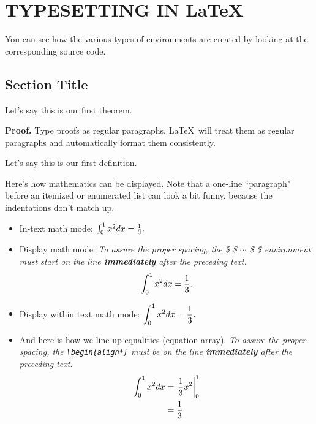 \chapter{TYPESETTING IN \LaTeX }\label{chap2:latex}


You can see how the various types of environments
are created by looking at the corresponding source code.


\section{Section Title}

\begin{theorem}
\label{th1}

Let's say this is our first theorem.

\end{theorem}


{\bf Proof.}
Type proofs as regular paragraphs. \LaTeX \ will treat them as
regular paragraphs and automatically format them consistently.


\begin{definition}
\label{def1}

Let's say this is our first definition.

\end{definition}


Here's how mathematics can be displayed.
Note that a one-line ``paragraph" before an
itemized or enumerated list can look a bit funny, because the
indentations don't match up.

\begin{itemize}
\item
In-text math mode: $\int _0 ^1 x^2 dx = {1\over 3} .$



\item
Display  math mode:
{\em
To assure the proper spacing, the \$ \$ $\cdots $ \$ \$
environment
must start on the line {\bf immediately} after the preceding text.}
$$\int _0 ^1 x^2 dx = {1\over 3} .$$

\item
Display within text math mode: $\displaystyle{ \int _0 ^1 x^2 dx = {1\over 3} .} $

\item
And here is how we line up equalities (equation array).
{\em To assure the proper spacing, the \verb+\begin{align*}+
must be on the line {\bf immediately} after the preceding text.}
\begin{align*}
\int _0 ^1 x^2 dx
& =
\left. {1\over 3} x^2 \right| _{0} ^1
\\
& =
{1\over 3}
\end{align*}

\end{itemize}



